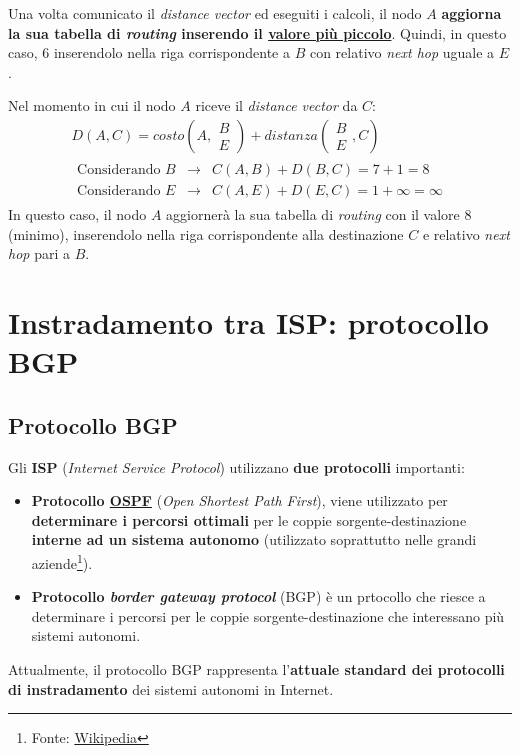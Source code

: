 \documentclass[a4paper]{article}
\begin{document}
	\noindent
	Una volta comunicato il \emph{distance vector} ed eseguiti i calcoli, il nodo $A$ \textbf{aggiorna la sua tabella di \emph{routing} inserendo il \underline{valore più piccolo}}. Quindi, in questo caso, $6$ inserendolo nella riga corrispondente a $B$ con relativo \emph{next hop} uguale a $E$.\newline
	
	\noindent
	Nel momento in cui il nodo $A$ riceve il \emph{distance vector} da $C$:
	\begin{gather*}
		D\left(A,C\right) = costo \left(A, \begin{matrix}
			B \\
			E
		\end{matrix}\right) + distanza \left(\begin{matrix}
			B \\
			E
		\end{matrix}, C\right)\\
		\begin{array}{lll}
			\text{Considerando } B & \longrightarrow & C\left(A,B\right) + D\left(B,C\right) = 7 + 1 = 8 \\
			\text{Considerando } E & \longrightarrow & C\left(A,E\right) + D\left(E,C\right) = 1 + \infty = \infty
		\end{array}
	\end{gather*}
	In questo caso, il nodo $A$ aggiornerà la sua tabella di \emph{routing} con il valore $8$ (minimo), inserendolo nella riga corrispondente alla destinazione $C$ e relativo \emph{next hop} pari a $B$.\newpage
	
	\section{Instradamento tra ISP: protocollo BGP}
	
	\subsection{Protocollo BGP}

	Gli \textcolor{Red3}{\textbf{ISP} (\emph{Internet Service Protocol})} utilizzano \textbf{due protocolli} importanti:
	\begin{itemize}
		\item \textbf{Protocollo \underline{OSPF}} (\emph{Open Shortest Path First}), viene utilizzato per \textbf{determinare i percorsi ottimali} per le coppie sorgente-destinazione \textbf{interne ad un sistema autonomo} (utilizzato soprattutto nelle grandi aziende\footnote{Fonte: \href{https://it.wikipedia.org/wiki/Open_Shortest_Path_First}{Wikipedia}}).
		
		\item \textbf{Protocollo \textcolor{Red3}{\textbf{\emph{border gateway protocol}}}} (BGP) è un prtocollo che riesce a determinare i percorsi per le coppie sorgente-destinazione che interessano più sistemi autonomi.
	\end{itemize}
	Attualmente, il protocollo BGP rappresenta l'\textbf{attuale standard dei protocolli di instradamento} dei sistemi autonomi in Internet.\newline
	
\end{document}
